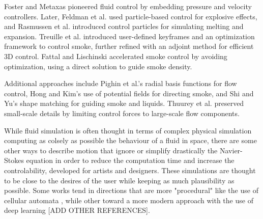 Foster and Metaxas pioneered fluid control by embedding pressure and velocity controllers. Later, Feldman et al. used particle-based control for explosive effects, and Rasmussen et al. introduced control particles for simulating melting and expansion. Treuille et al. introduced user-defined keyframes and an optimization framework to control smoke, further refined with an adjoint method for efficient 3D control. Fattal and Lischinski accelerated smoke control by avoiding optimization, using a direct solution to guide smoke density.

Additional approaches include Pighin et al.'s radial basis functions for flow control, Hong and Kim's use of potential fields for directing smoke, and Shi and Yu's shape matching for guiding smoke and liquids. Thuurey et al. preserved small-scale details by limiting control forces to large-scale flow components.

While fluid simulation is often thought in terms of complex physical simulation computing as colsely as possible the behaviour of a fluid in space, there are some other ways to describe motion that ignore or simplify drastically the Navier-Stokes equation in order to reduce the computation time and increase the controlability, developed for artists and designers. These simulations are thought to be close to the desires of the user while keeping as much plausibility as possible. Some works tend in directions that are more "procedural" like the use of cellular automata \cite{Boldea2009,Cattaneo2005}, while other toward a more modern approach with the use of deep learning \cite{Tompson2017} [ADD OTHER REFERENCES].


